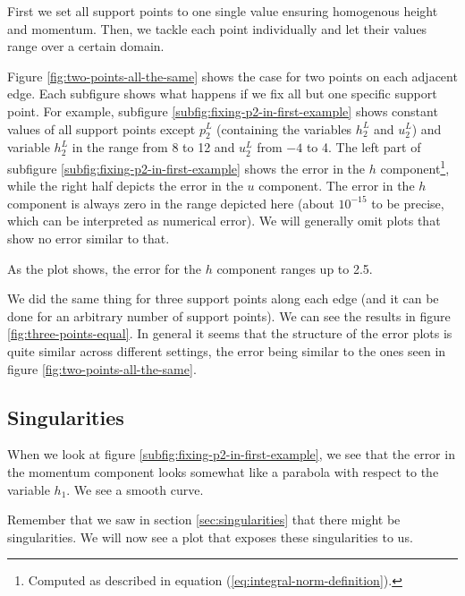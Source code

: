 \documentclass{article}
\begin{document}
First we set all support points to one single value ensuring homogenous height and momentum. Then, we tackle each point individually and let their values range over a certain domain.



Figure \ref{fig:two-points-all-the-same} shows the case for two points on each adjacent edge. Each subfigure shows what happens if we fix all but one specific support point. For example, subfigure \ref{subfig:fixing-p2-in-first-example} shows constant values of all support points except $p_2^L$ (containing the variables $h_2^L$ and $u_2^L$) and variable $h_2^L$ in the range from 8 to 12 and $u_2^L$ from $-4$ to 4.
The left part of subfigure \ref{subfig:fixing-p2-in-first-example} shows the error in the $h$ component\footnote{Computed as described in equation (\ref{eq:integral-norm-definition}).}, while the right half depicts the error in the $u$ component.
The error in the $h$ component is always zero in the range depicted here (about $10^{-15}$ to be precise, which can be interpreted as numerical error). We will generally omit plots that show no error similar to that.

As the plot shows, the error for the $h$ component ranges up to 2.5.

We did the same thing for three support points along each edge (and it can be done for an arbitrary number of support points). We can see the results in figure \ref{fig:three-points-equal}. In general it seems that the structure of the error plots is quite similar across different settings, the error being similar to the ones seen in figure \ref{fig:two-points-all-the-same}.



\subsection{Singularities}
\label{sec:plots-discontinuities}

When we look at figure \ref{subfig:fixing-p2-in-first-example}, we see that the error in the momentum component looks somewhat like a parabola with respect to the variable $h_1$. We see a smooth curve.

Remember that we saw in section \ref{sec:singularities} that there might be singularities. We will now see a plot that exposes these singularities to us.


\end{document}
